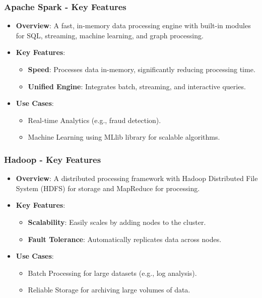\documentclass[aspectratio=169]{beamer}
\begin{document}
\begin{frame}[fragile]
    \frametitle{Apache Spark - Key Features}
    \begin{itemize}
        \item \textbf{Overview}: A fast, in-memory data processing engine with built-in modules for SQL, streaming, machine learning, and graph processing.
        \item \textbf{Key Features}:
        \begin{itemize}
            \item \textbf{Speed}: Processes data in-memory, significantly reducing processing time.
            \item \textbf{Unified Engine}: Integrates batch, streaming, and interactive queries.
        \end{itemize}
        \item \textbf{Use Cases}:
        \begin{itemize}
            \item Real-time Analytics (e.g., fraud detection).
            \item Machine Learning using MLlib library for scalable algorithms.
        \end{itemize}
    \end{itemize}
\end{frame}

\begin{frame}[fragile]
    \frametitle{Hadoop - Key Features}
    \begin{itemize}
        \item \textbf{Overview}: A distributed processing framework with Hadoop Distributed File System (HDFS) for storage and MapReduce for processing.
        \item \textbf{Key Features}:
        \begin{itemize}
            \item \textbf{Scalability}: Easily scales by adding nodes to the cluster.
            \item \textbf{Fault Tolerance}: Automatically replicates data across nodes.
        \end{itemize}
        \item \textbf{Use Cases}:
        \begin{itemize}
            \item Batch Processing for large datasets (e.g., log analysis).
            \item Reliable Storage for archiving large volumes of data.
        \end{itemize}
    \end{itemize}
\end{frame}
\end{document}

